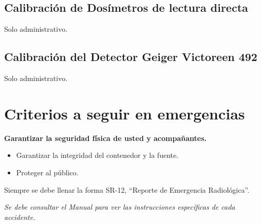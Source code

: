 \section*{Calibración de Dosímetros de lectura directa}
Solo administrativo.

\section*{Calibración del Detector Geiger Victoreen 492}
Solo administrativo.

\chapter{Criterios a seguir en emergencias}
\textbf{Garantizar la seguridad física de usted y acompañantes.}
\begin{itemize}
  \item Garantizar la integridad del contenedor y la fuente.
  \item Proteger al público.
\end{itemize}

Siempre se debe llenar la forma SR-12, ``Reporte de Emergencia Radiológica''.

\textit{Se debe consultar el Manual para ver las instrucciones específicas de cada accidente.}
